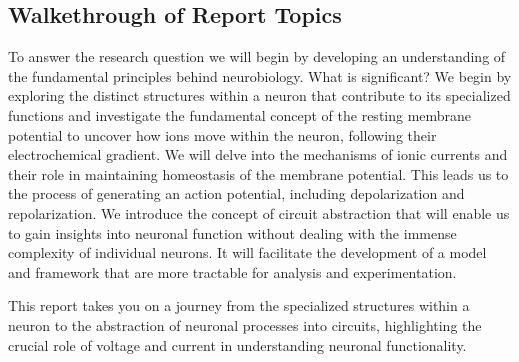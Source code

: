 \documentclass[class={myRUCProject}, crop=false]{standalone}
\begin{document}
\subsection*{Walkethrough of Report Topics}
\vspace{-5truemm}
To answer the research question we will begin by developing an understanding of the fundamental principles behind neurobiology. What is significant?
We begin by exploring the distinct structures within a neuron that contribute to its specialized functions and investigate the fundamental concept of the resting membrane potential to uncover how ions move within the neuron, following their electrochemical gradient. We will delve into the mechanisms of ionic currents and their role in maintaining homeostasis of the membrane potential. This leads us to the process of generating an action potential, including depolarization and repolarization.
We introduce the concept of circuit abstraction that will enable us to gain insights into neuronal function without dealing with the immense complexity of individual neurons. It will facilitate the development of a model and framework that are more tractable for analysis and experimentation.

This report takes you on a journey from the specialized structures within a neuron to the abstraction of neuronal processes into circuits, highlighting the crucial role of voltage and current in understanding neuronal functionality.
\end{document}
